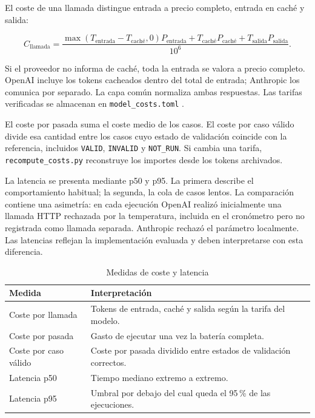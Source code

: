 El coste de una llamada distingue entrada a precio completo, entrada en caché y salida:

\begin{equation}
C_{\text{llamada}}
=
\frac{\max(T_{\text{entrada}}-T_{\text{caché}},0)P_{\text{entrada}}
+T_{\text{caché}}P_{\text{caché}}+T_{\text{salida}}P_{\text{salida}}}{10^6}.
\end{equation}

Si el proveedor no informa de caché, toda la entrada se valora a precio completo. OpenAI incluye los tokens cacheados dentro del total de entrada; Anthropic los comunica por separado. La capa común normaliza ambas respuestas. Las tarifas verificadas se almacenan en \texttt{model\_costs.toml} \citep{openai2026pricing,anthropic2026pricing}.

El coste por pasada suma el coste medio de los casos. El coste por caso válido divide esa cantidad entre los casos cuyo estado de validación coincide con la referencia, incluidos \texttt{VALID}, \texttt{INVALID} y \texttt{NOT\_RUN}. Si cambia una tarifa, \texttt{recompute\_costs.py} reconstruye los importes desde los tokens archivados.

La latencia se presenta mediante p50 y p95. La primera describe el comportamiento habitual; la segunda, la cola de casos lentos. La comparación contiene una asimetría: en cada ejecución OpenAI realizó inicialmente una llamada HTTP rechazada por la temperatura, incluida en el cronómetro pero no registrada como llamada separada. Anthropic rechazó el parámetro localmente. Las latencias reflejan la implementación evaluada y deben interpretarse con esta diferencia.

\begin{table}[H]
\centering
\small
\caption{Medidas de coste y latencia}
\label{tab:medicion_coste_latencia}
\begin{tabular}{|P{3.5cm}|P{9.5cm}|}
\hline
\textbf{Medida} & \textbf{Interpretación} \\
\hline
Coste por llamada & Tokens de entrada, caché y salida según la tarifa del modelo. \\
\hline
Coste por pasada & Gasto de ejecutar una vez la batería completa. \\
\hline
Coste por caso válido & Coste por pasada dividido entre estados de validación correctos. \\
\hline
Latencia p50 & Tiempo mediano extremo a extremo. \\
\hline
Latencia p95 & Umbral por debajo del cual queda el 95\,\% de las ejecuciones. \\
\hline
\end{tabular}
\end{table}

